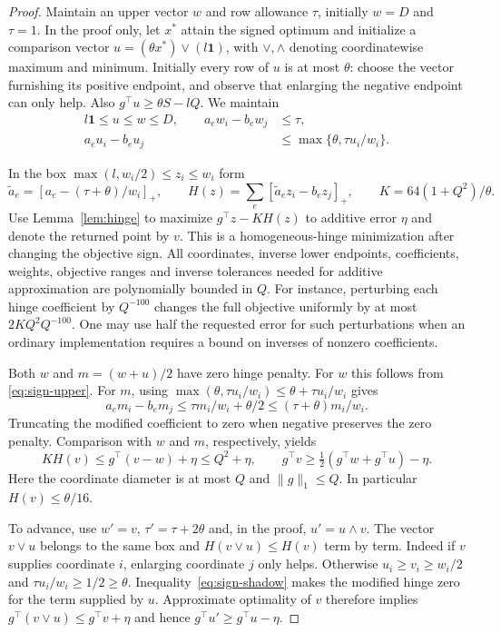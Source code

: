 \documentclass[11pt,letterpaper]{article}
\begin{document}
\begin{proof}
Maintain an upper vector $w$ and row allowance $\tau$, initially $w=D$ and $\tau=1$. In the proof only, let $x^*$ attain the signed optimum and initialize a comparison vector $u=(\theta x^*)\vee(l\mathbf1)$, with $\vee,\wedge$ denoting coordinatewise maximum and minimum. Initially every row of $u$ is at most $\theta$: choose the vector furnishing its positive endpoint, and observe that enlarging the negative endpoint can only help. Also $g^\top u\ge\theta S-lQ$. We maintain
\begin{align}
 l\mathbf1\le u\le w\le D,\qquad
 a_e w_i-b_e w_j&\le\tau,\label{eq:sign-upper}\\
 a_e u_i-b_e u_j&\le \max\{\theta,\tau u_i/w_i\}.\label{eq:sign-shadow}
\end{align}

In the box $\max(l,w_i/2)\le z_i\le w_i$ form
\[
 \tilde a_e=[a_e-(\tau+\theta)/w_i]_+,
 \qquad H(z)=\sum_e[\tilde a_e z_i-b_e z_j]_+,
 \qquad K=64(1+Q^2)/\theta.
\]
Use Lemma~\ref{lem:hinge} to maximize $g^\top z-KH(z)$ to additive error $\eta$ and denote the returned point by $v$. This is a homogeneous-hinge minimization after changing the objective sign. All coordinates, inverse lower endpoints, coefficients, weights, objective ranges and inverse tolerances needed for additive approximation are polynomially bounded in $Q$. For instance, perturbing each hinge coefficient by $Q^{-100}$ changes the full objective uniformly by at most $2KQ^2 Q^{-100}$. One may use half the requested error for such perturbations when an ordinary implementation requires a bound on inverses of nonzero coefficients.

Both $w$ and $m=(w+u)/2$ have zero hinge penalty. For $w$ this follows from \eqref{eq:sign-upper}. For $m$, using $\max(\theta,\tau u_i/w_i)\le\theta+\tau u_i/w_i$ gives
\[
 a_e m_i-b_e m_j\le \tau m_i/w_i+\theta/2\le (\tau+\theta)m_i/w_i .
\]
Truncating the modified coefficient to zero when negative preserves the zero penalty. Comparison with $w$ and $m$, respectively, yields
\[
 KH(v)\le g^\top(v-w)+\eta\le Q^2+\eta,\qquad
 g^\top v\ge\tfrac12(g^\top w+g^\top u)-\eta .
\]
Here the coordinate diameter is at most $Q$ and $\|g\|_1\le Q$. In particular $H(v)\le\theta/16$.

To advance, use $w'=v$, $\tau'=\tau+2\theta$ and, in the proof, $u'=u\wedge v$. The vector $v\vee u$ belongs to the same box and $H(v\vee u)\le H(v)$ term by term. Indeed if $v$ supplies coordinate $i$, enlarging coordinate $j$ only helps. Otherwise $u_i\ge v_i\ge w_i/2$ and $\tau u_i/w_i\ge1/2\ge\theta$. Inequality~\eqref{eq:sign-shadow} makes the modified hinge zero for the term supplied by $u$. Approximate optimality of $v$ therefore implies $g^\top(v\vee u)\le g^\top v+\eta$ and hence $g^\top u'\ge g^\top u-\eta$.


\end{proof}
\end{document}
